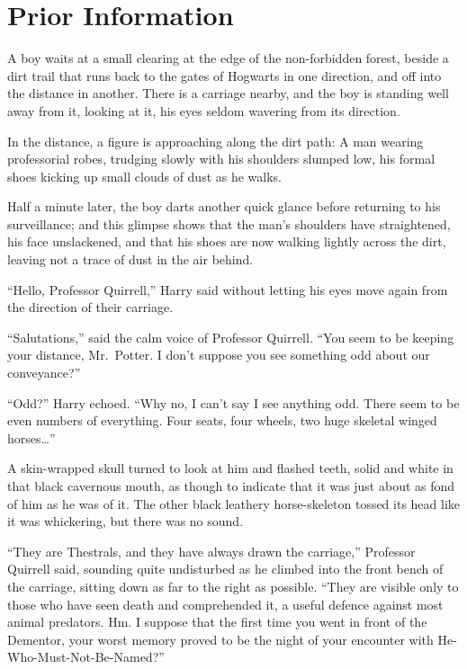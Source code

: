 \chapter{Prior Information}

A boy waits at a small clearing at the edge of the non-forbidden forest,
beside a dirt trail that runs back to the gates of Hogwarts in one
direction, and off into the distance in another. There is a carriage
nearby, and the boy is standing well away from it, looking at it, his
eyes seldom wavering from its direction.

In the distance, a figure is approaching along the dirt path: A man
wearing professorial robes, trudging slowly with his shoulders slumped
low, his formal shoes kicking up small clouds of dust as he walks.

Half a minute later, the boy darts another quick glance before returning
to his surveillance; and this glimpse shows that the man's shoulders
have straightened, his face unslackened, and that his shoes are now
walking lightly across the dirt, leaving not a trace of dust in the air
behind.

``Hello, Professor Quirrell,'' Harry said without letting his eyes move
again from the direction of their carriage.

``Salutations,'' said the calm voice of Professor Quirrell. ``You seem
to be keeping your distance, Mr.~Potter. I don't suppose you see
something odd about our conveyance?''

``Odd?'' Harry echoed. ``Why no, I can't say I see anything odd. There
seem to be even numbers of everything. Four seats, four wheels, two huge
skeletal winged horses\ldots{}''

A skin-wrapped skull turned to look at him and flashed teeth, solid and
white in that black cavernous mouth, as though to indicate that it was
just about as fond of him as he was of it. The other black leathery
horse-skeleton tossed its head like it was whickering, but there was no
sound.

``They are Thestrals, and they have always drawn the carriage,''
Professor Quirrell said, sounding quite undisturbed as he climbed into
the front bench of the carriage, sitting down as far to the right as
possible. ``They are visible only to those who have seen death and
comprehended it, a useful defence against most animal predators. Hm. I
suppose that the first time you went in front of the Dementor, your
worst memory proved to be the night of your encounter with
He-Who-Must-Not-Be-Named?''

